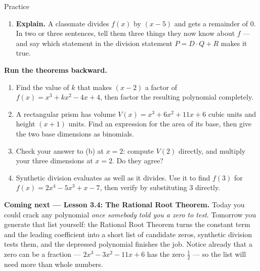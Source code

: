 \documentclass[10pt]{article}
\begin{document}
\begin{notesbox}{Practice}
\begin{enumerate}[leftmargin=1.9em, itemsep=11pt]
  \item \textbf{Explain.} A classmate divides $f(x)$ by $(x - 5)$ and gets a remainder of $0$. In two
        or three sentences, tell them three things they now know about $f$ --- and say which
        statement in the division statement $P = D\cdot Q + R$ makes it true. 
    \end{enumerate}
\end{notesbox}

\begin{extensionbox}
\textbf{Run the theorems backward.}
\begin{enumerate}[label=(\alph*), leftmargin=1.8em, itemsep=5pt]
  \item Find the value of $k$ that makes $(x - 2)$ a factor of $f(x) = x^3 + kx^2 - 4x + 4$, then
        factor the resulting polynomial completely. 
  \item A rectangular prism has volume $V(x) = x^3 + 6x^2 + 11x + 6$ cubic units and height
        $(x + 1)$ units. Find an expression for the area of its base, then give the two base
        dimensions as binomials. 
  \item Check your answer to (b) at $x = 2$: compute $V(2)$ directly, and multiply your three
        dimensions at $x=2$. Do they agree? 
  \item Synthetic division evaluates as well as it divides. Use it to find $f(3)$ for
        $f(x) = 2x^4 - 5x^3 + x - 7$, then verify by substituting $3$ directly. 
\end{enumerate}
\end{extensionbox}

\begin{spiralbox}
\textbf{Coming next --- Lesson 3.4: The Rational Root Theorem.} Today you could crack any polynomial
\emph{once somebody told you a zero to test}. Tomorrow you generate that list yourself: the Rational
Root Theorem turns the constant term and the leading coefficient into a short list of candidate
zeros, synthetic division tests them, and the depressed polynomial finishes the job. Notice already
that a zero can be a fraction --- $2x^3-3x^2-11x+6$ has the zero $\tfrac12$ --- so the list will need
more than whole numbers.
\end{spiralbox}
\end{document}
